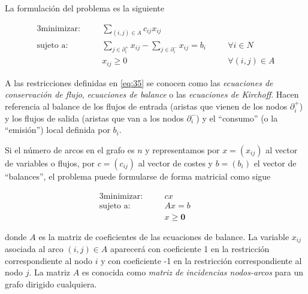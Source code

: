 \noindent La formulación del problema es la siguiente

\begin{alignat}{3}
    \text{minimizar:}   & \quad & \sum_{(i,j)\in A}c_{ij}x_{ij}                                     & \quad &                               \\
    \text{sujeto a:}    & \quad & \sum_{j\in \partial_i^+}x_{ij}-\sum_{j\in \partial_i^-}x_{ij}=b_i &       & \forall i\in N \label{eq:35}  \\
                        & \quad & x_{ij}\geq 0                                                      &       & \forall (i,j)\in A     
\end{alignat}

A las restricciones definidas en \ref{eq:35} se conocen como las \textit{ecuaciones de conservación de flujo}, 
\textit{ecuaciones de balance} o las \textit{ecuaciones de Kirchoff}. Hacen referencia al balance de los flujos de entrada
(aristas que vienen de los nodos $\partial_i^+$) y los flujos de salida (aristas que van a los nodos $\partial_i^-$) y el 
``consumo'' (o la ``emisión'') local definida por $b_i$.

\vspace*{2mm}

Si el número de arcos en el grafo es $n$ y representamos por $x=(x_{ij})$ al vector de variables o flujos, por $c=(c_{ij})$
al vector de costes y $b=(b_{i})$ el vector de ``balances'', el problema puede formularse de forma matricial como sigue

\begin{alignat}{3}
    \text{minimizar:}   & \quad & cx                & \quad &   \\
    \text{sujeto a:}    & \quad & Ax=b              &       &   \\
                        & \quad & x\geq \mathbf{0}  &       &        
\end{alignat}

donde $A$ es la matriz de coeficientes de las ecuaciones de balance. La variable $x_{ij}$ asociada al arco $(i,j)\in A$
aparecerá con coeficiente 1 en la restricción correspondiente al nodo $i$ y con coeficiente -1 en la restricción correspondiente
al nodo $j$. La matriz $A$ es conocida como \textit{matriz de incidencias nodos-arcos} para un grafo dirigido cualquiera.

\newpage

